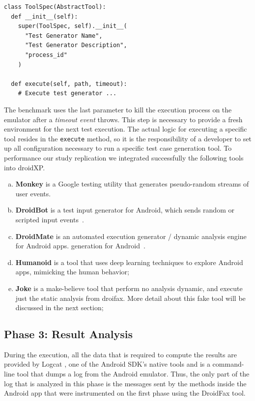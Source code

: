 \begin{lstlisting}[caption=ToolSpec Sample,label={lst:toolspec}]
class ToolSpec(AbstractTool):
  def __init__(self):
    super(ToolSpec, self).__init__(
      "Test Generator Name", 
      "Test Generator Description", 
      "process_id"
    )
        
  def execute(self, path, timeout):
    # Execute test generator ...
\end{lstlisting}

The benchmark uses the last parameter to kill the execution process
on the emulator after a \emph{timeout event} throws.
This step is necessary to provide a fresh environment
for the next test execution. The actual logic for executing a
specific tool resides in the  \texttt{execute} method,
so it is the responsibility of a developer to
set up all configuration necessary to run a specific
test case generation tool. To performance our study replication we integrated successfully 
the following tools into droidXP. 

\begin{enumerate}[(a)]
  \item {\bf Monkey} is a Google testing utility that generates
    pseudo-random streams of user events. 
    \item {\bf DroidBot}  is a test input generator for
       Android, which sends random or scripted input events~\cite{li2017droidbot}. 
    \item {\bf DroidMate} is an automated execution generator /
      dynamic analysis engine for Android apps\cite{jamrozik2016droidmate}. 
      generation for Android~\cite{mao2016sapienz}. 
    \item {\bf Humanoid} is a tool that uses deep learning techniques to explore Android apps, mimicking the human behavior\cite{li2019deep}; 
    \item {\bf Joke} is a make-believe tool that perform no analysis dynamic, and execute just the static analysis from droifax. More detail about this fake tool will be discussed in the next section; 
\end{enumerate}

\subsection{Phase 3: Result Analysis}

During the execution, all the data that is required to compute the results are provided by Logcat \cite{Logcat}, one of the Android SDK's native tools and is a command-line tool that dumps a log from the Android emulator. Thus, the only part of the log that is analyzed in this phase is the messages sent by the methods inside the Android app that were instrumented on the first phase using the DroidFax tool. 


